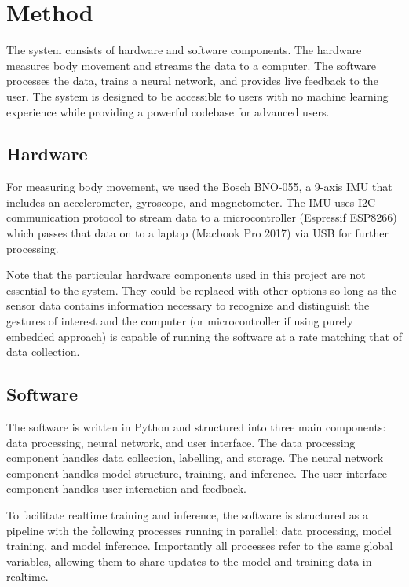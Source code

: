 \documentclass{article}
\begin{document}
\section{Method}
The system consists of hardware and software components. The hardware measures body movement and streams the data to a computer. The software processes the data, trains a neural network, and provides live feedback to the user. The system is designed to be accessible to users with no machine learning experience while providing a powerful codebase for advanced users.

\subsection{Hardware}
For measuring body movement, we used the Bosch BNO-055, a 9-axis IMU that includes an accelerometer, gyroscope, and magnetometer. The IMU uses I2C communication protocol to stream data to a microcontroller (Espressif ESP8266) which passes that data on to a laptop  (Macbook Pro 2017) via USB for further processing.

Note that the particular hardware components used in this project are not essential to the system. They could be replaced with other options so long as the sensor data contains information necessary to recognize and distinguish the gestures of interest and the computer (or microcontroller if using purely embedded approach) is capable of running the software at a rate matching that of data collection.

\subsection{Software}
The software is written in Python and structured into three main components: data processing, neural network, and user interface. The data processing component handles data collection, labelling, and storage. The neural network component handles model structure, training, and inference. The user interface component handles user interaction and feedback.

To facilitate realtime training and inference, the software is structured as a pipeline with the following processes running in parallel: data processing, model training, and model inference. Importantly all processes refer to the same global variables, allowing them to share updates to the model and training data in realtime.
\end{document}
